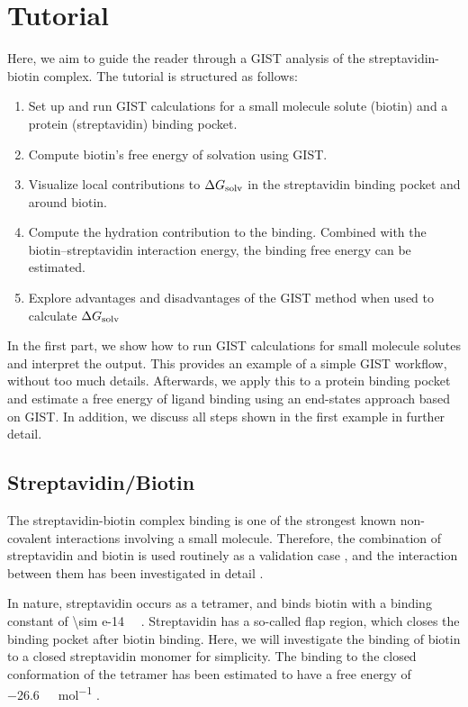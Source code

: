 \documentclass[9pt,tutorial]{livecoms}
\newcommand{\dgsolv}{\Delta G_\textup{solv}}
\begin{document}
\pagebreak
\section{Tutorial}
Here, we aim to guide the reader through a GIST analysis of the streptavidin-biotin complex.
The tutorial is structured as follows:
\begin{enumerate}
	\item Set up and run GIST calculations for a small molecule solute (biotin) and a protein (streptavidin) binding pocket.
	\item Compute biotin's free energy of solvation using GIST.
	\item Visualize local contributions to $\dgsolv$ in the streptavidin binding pocket and around biotin.
	\item Compute the hydration contribution to the binding. Combined with the biotin--streptavidin interaction energy, the binding free energy can be estimated.
	\item Explore advantages and disadvantages of the GIST method when used to calculate  $\dgsolv$
\end{enumerate}

In the first part, we show how to run GIST calculations for small molecule solutes and interpret the output. This provides an example of a simple GIST workflow, without too much details.
Afterwards, we apply this to a protein binding pocket and estimate a free energy of ligand binding using an end-states approach based on GIST. In addition, we discuss all steps shown in the first example in further detail. 


\subsection{Streptavidin/Biotin}
The streptavidin-biotin complex binding is one of the strongest known non-covalent interactions involving a small molecule.
Therefore, the combination of streptavidin and biotin is used routinely as a validation case \cite{Dundas2013-streptavidin-review}, and the interaction between them has been investigated in detail \cite{McConnell2021-biotin}.

\newcommand{\appr}{{\mathord{\sim}}}
In nature, streptavidin occurs as a tetramer, and binds biotin with a binding constant of \SI{\sim e-14}{\per\Molar} \cite{Dundas2013-streptavidin-review}.
Streptavidin has a so-called flap region, which closes the binding pocket after biotin binding.
Here, we will investigate the binding of biotin to a closed streptavidin monomer for simplicity.
The binding to the closed conformation of the tetramer has been estimated to have a free energy of \SI{-26.6}{\kilo\calorie\per\mol} \cite{Bansal2018-biotin}.
\end{document}
